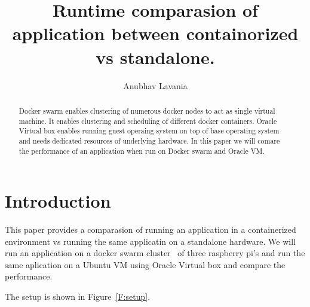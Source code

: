 
\title{Runtime comparasion of application between containorized vs standalone.}

\author{Anubhav Lavania}


\renewcommand{\shortauthors}{G. v. Laszewski}


\begin{abstract}
Docker swarm enables clustering of numerous docker nodes to act as
single virtual machine. It enables clustering and scheduling of
different docker containers. Oracle Virtual box enables running guest
operaing system on top of base operating system and needs dedicated
resources of underlying hardware. In this paper we will comare the
performance of an application when run on Docker swarm and Oracle VM.

\end{abstract}



\maketitle


\section{Introduction}

This paper provides a comparasion of running an application in a containerized
environment vs running the same applicatin on a standalone hardware. We will run
an application on a docker swarm cluster~\cite{hid-sp18-413-dockerswarm} of
three raspberry pi's and run the same aplication on a Ubuntu VM using Oracle
Virtual box and compare the performance.

The setup is shown in Figure~\ref{F:setup}.

